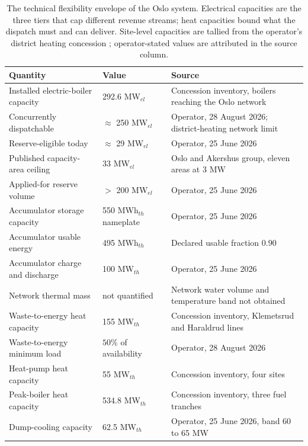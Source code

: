 \begin{table}[h]
\centering
\caption{The technical flexibility envelope of the Oslo system. Electrical capacities are the three tiers that cap different revenue streams; heat capacities bound what the dispatch must and can deliver. Site-level capacities are tallied from the operator's district heating concession \cite{nve_konsesjonssak_2026}; operator-stated values are attributed in the source column.}
\small
\begin{tabular}{p{4.6cm} p{2.6cm} p{7.2cm}}
\toprule
\textbf{Quantity} & \textbf{Value} & \textbf{Source} \\
\midrule
Installed electric-boiler capacity & 292.6 MW$_{el}$ & Concession inventory, boilers reaching the Oslo network \\
Concurrently dispatchable & $\approx$ 250 MW$_{el}$ & Operator, 28 August 2026; district-heating network limit \\
Reserve-eligible today & $\approx$ 29 MW$_{el}$ & Operator, 25 June 2026 \\
Published capacity-area ceiling & 33 MW$_{el}$ & Oslo and Akershus group, eleven areas at 3 MW \cite{statnett_innforing_2026} \\
Applied-for reserve volume & $>$ 200 MW$_{el}$ & Operator, 25 June 2026 \\
\addlinespace
Accumulator storage capacity & 550 MWh$_{th}$ nameplate & Operator, 25 June 2026 \\
Accumulator usable energy & 495 MWh$_{th}$ & Declared usable fraction $0.90$ \\
Accumulator charge and discharge & 100 MW$_{th}$ & Operator, 25 June 2026 \\
Network thermal mass & not quantified & Network water volume and temperature band not obtained \\
\addlinespace
Waste-to-energy heat capacity & 155 MW$_{th}$ & Concession inventory, Klemetsrud and Haraldrud lines \\
Waste-to-energy minimum load & $50\%$ of availability & Operator, 28 August 2026 \\
Heat-pump heat capacity & 55 MW$_{th}$ & Concession inventory, four sites \\
Peak-boiler heat capacity & 534.8 MW$_{th}$ & Concession inventory, three fuel tranches \\
Dump-cooling capacity & 62.5 MW$_{th}$ & Operator, 25 June 2026, band 60 to 65 MW \\
\bottomrule
\end{tabular}
\label{tab:3.3 technical envelope}
\end{table}

